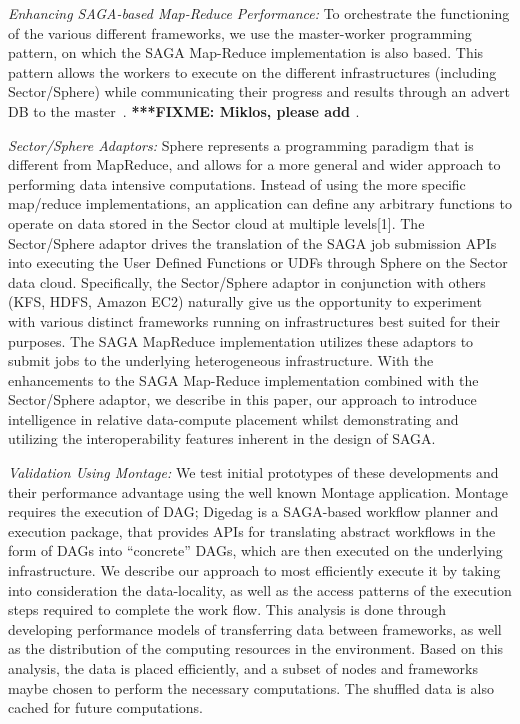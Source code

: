 \documentclass[a4paper,11pt]{article}
\newcommand{\fixme}[1]{ { \bf{ ***FIXME: #1 }} }
\newcommand{\fixme}[1]{}
\begin{document}
{\it Enhancing SAGA-based Map-Reduce Performance:} To orchestrate the functioning of the various different frameworks, we use the master-worker programming pattern, on which the SAGA Map-Reduce implementation is also based. This pattern allows the workers to execute on the different infrastructures (including Sector/Sphere) while communicating their progress and results through an advert DB to the master~\cite{sector}. \fixme{Miklos, please add}.

{\it Sector/Sphere Adaptors: }Sphere represents a programming paradigm that is different from MapReduce, and allows for a more general and wider approach to performing data intensive computations. Instead of using the more specific map/reduce implementations, an application can define any arbitrary functions to operate on data stored in the Sector cloud at multiple levels[1]. The Sector/Sphere adaptor drives the translation of the SAGA job submission APIs into executing the User Defined Functions or UDFs through Sphere on the Sector data cloud.  Specifically, the Sector/Sphere adaptor in conjunction with others (KFS, HDFS, Amazon EC2) naturally give us the opportunity to experiment with various distinct frameworks running on infrastructures best suited for their purposes. The SAGA MapReduce implementation utilizes these adaptors to submit jobs to the underlying heterogeneous infrastructure. With the enhancements to the SAGA Map-Reduce implementation combined with the Sector/Sphere adaptor, we describe in this paper, our approach to introduce intelligence in relative data-compute placement whilst demonstrating and utilizing the interoperability features inherent in the design of SAGA. 

{\it Validation Using Montage: } We test initial prototypes of these developments and their performance advantage using the well known Montage application.  Montage requires the execution of DAG;
Digedag is a SAGA-based workflow planner and execution package, that provides APIs for translating abstract workflows in the form of DAGs into “concrete” DAGs, which are then executed on the underlying infrastructure.
We describe our approach to most efficiently execute it by taking into consideration the data-locality, as well as the access patterns of the execution steps required to complete the work flow. This analysis is done through developing performance models of transferring data between frameworks, as well as the distribution of the computing resources in the environment. Based on this analysis, the data is placed efficiently, and a subset of nodes and frameworks maybe chosen to perform the necessary computations. The shuffled data is also cached for future computations.
\end{document}
